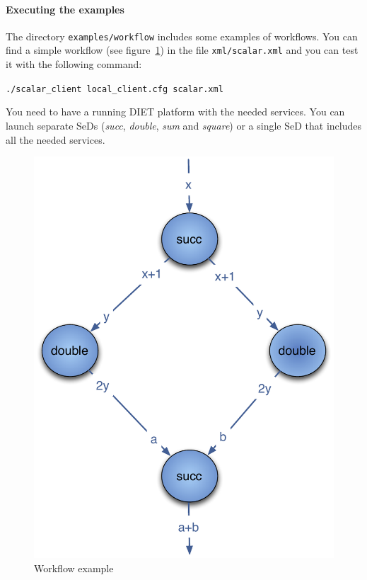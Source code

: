 %
%
%

\paragraph{Executing the examples}

The directory \texttt{examples/workflow} includes some examples of
workflows.  You can find a simple workflow (see
figure~\ref{fig:example1}) in the file \texttt{xml/scalar.xml} and you
can test it with the following command:

\verb|./scalar_client local_client.cfg scalar.xml |

You need to have a running DIET platform with the needed services. You
can launch separate SeDs (\textit{succ}, \textit{double}, \textit{sum}
and \textit{square}) or a single SeD that includes all the needed
services.

\begin{figure}[htbp]
  \centering
  \includegraphics[keepaspectratio,width=0.4\linewidth]{fig/wf_example1}
  \caption{Workflow example}
  \label{fig:example1}
\end{figure}

